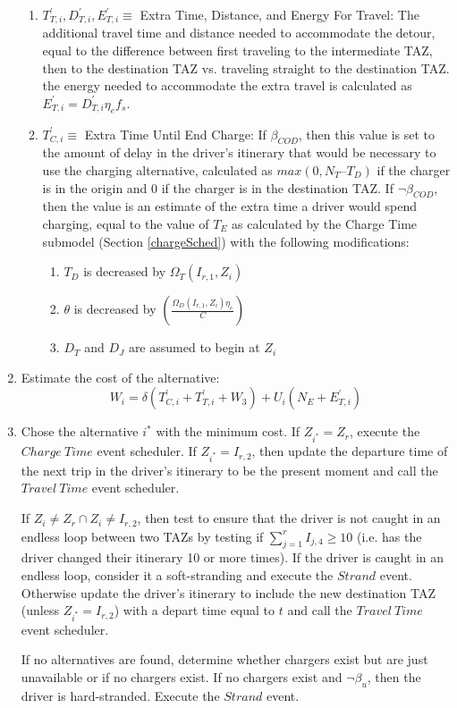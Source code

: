 \documentclass[journal]{IEEEtran}
\begin{document}
\begin{enumerate}[label=(\alph*)]
\begin{enumerate}[label=(\roman*)]
  \item $T^{\prime}_{T,i}, D^{\prime}_{T,i}, E^{\prime}_{T,i} \equiv$ Extra Time, Distance, and Energy For Travel: The additional travel time and distance needed to accommodate the detour, equal to the difference between first traveling to the intermediate TAZ, then to the destination TAZ vs. traveling straight to the destination TAZ. the energy needed to accommodate the extra travel is calculated as $E^{\prime}_{T,i} = D^{\prime}_{T,i} \eta_e f_s$.
  \item $T^{\prime}_{C,i} \equiv$ Extra Time Until End Charge: If $\beta_{COD} $, then this value is set to the amount of delay in the driver's itinerary that would be necessary to use the charging alternative, calculated as $max(0, N_T – T_D)$ if the charger is in the origin and $0$ if the charger is in the destination TAZ. If $\neg \beta_{COD}$, then the value is an estimate of the extra time a driver would spend charging, equal to the value of $T_E$ as calculated by the Charge Time submodel (Section \ref{chargeSched}) with the following modifications:
    \begin{enumerate}[label=(\roman*)]
      \item $T_D$ is decreased by $\Omega_T(I_{r,1},Z_i)$
      \item $\theta$ is decreased by $\left(\frac{\Omega_D(I_{r,1},Z_i) \eta_e}{C}\right)$ 
      \item $D_T$ and $D_J$ are assumed to begin at $Z_i$
    \end{enumerate}
  \end{enumerate}
\item Estimate the cost of the alternative:
  \begin{equation}
    W_i = \delta (T^{\prime}_{C,i} + T^{\prime}_{T,i} + W_3) + U_i(N_E +  E^{\prime}_{T,i})
  \end{equation}
\item Chose the alternative $i^*$ with the minimum cost.  If $Z_{i^*} = Z_r$, execute the $Charge ~Time$ event scheduler. If $Z_{i^*} = I_{r,2}$, then update the departure time of the next trip in the driver's itinerary to be the present moment and call the $Travel ~Time$ event scheduler.

  If $Z_i \ne Z_r \cap Z_i \ne I_{r,2}$, then test to ensure that the driver is not caught in an endless loop between two TAZs by testing if $\sum_{j=1}^r I_{j,4} \ge 10$ (i.e. has the driver changed their itinerary 10 or more times).  If the driver is caught in an endless loop, consider it a soft-stranding and execute the $Strand$ event.  Otherwise update the driver's itinerary to include the new destination TAZ (unless $Z_{i^*} = I_{r,2}$) with a depart time equal to $t$ and call the $Travel ~Time$ event scheduler.  

If no alternatives are found, determine whether chargers exist but are just unavailable or if no chargers exist.  If no chargers exist and $\neg \beta_u $, then the driver is hard-stranded.  Execute the $Strand$ event. 
\end{enumerate}
\end{document}
